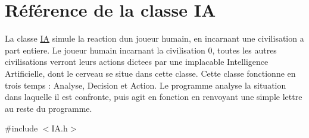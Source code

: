 \hypertarget{classIA}{}\section{Référence de la classe IA}
\label{classIA}


La classe \hyperlink{classIA}{IA} simule la reaction d\textquotesingle{}un joueur humain, en incarnant une civilisation a part entiere. Le joueur humain incarnant la civilisation 0, toutes les autres civilisations verront leurs actions dictees par une implacable Intelligence Artificielle, dont le cerveau se situe dans cette classe. Cette classe fonctionne en trois temps \+: Analyse, Decision et Action. Le programme analyse la situation dans laquelle il est confronte, puis agit en fonction en renvoyant une simple lettre au reste du programme.  




{\ttfamily \#include $<$I\+A.\+h$>$}

